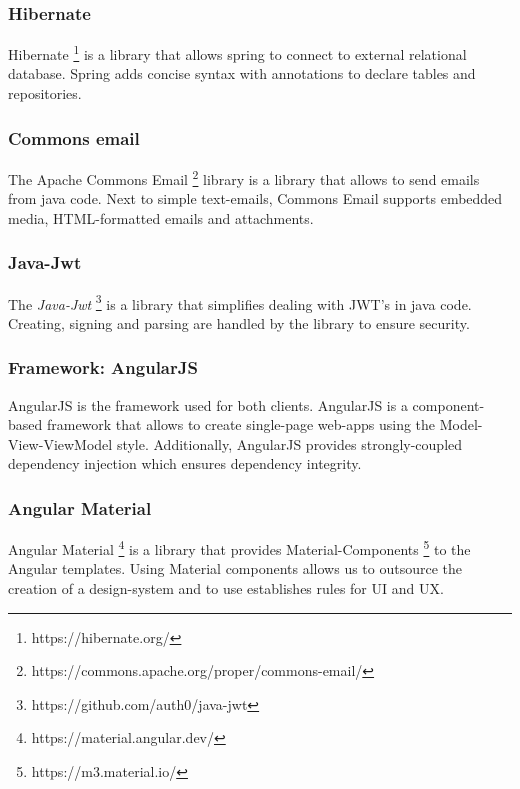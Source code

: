 \subsubsection{Hibernate}
Hibernate \footnote{https://hibernate.org/} is a library that allows spring to connect to external relational database.
Spring adds concise syntax with annotations to declare tables and repositories.

\subsubsection{Commons email}\label{subsubsec:commons-email}
The Apache Commons Email \footnote{https://commons.apache.org/proper/commons-email/} library is a library that allows to send emails from java code.
Next to simple text-emails, Commons Email supports embedded media, HTML-formatted emails and attachments.

\subsubsection{Java-Jwt}
The \textit{Java-Jwt} \footnote{https://github.com/auth0/java-jwt} is a library that simplifies dealing with JWT's in java code.
Creating, signing and parsing are handled by the library to ensure security.

\subsubsection{Framework: AngularJS}
AngularJS is the framework used for both clients. \newline
AngularJS is a component-based framework that allows to create single-page web-apps using the Model-View-ViewModel style.
Additionally, AngularJS provides strongly-coupled dependency injection which ensures dependency integrity.

\subsubsection{Angular Material}
Angular Material \footnote{https://material.angular.dev/} is a library that provides Material-Components \footnote{https://m3.material.io/} to the Angular templates.
Using Material components allows us to outsource the creation of a design-system and to use establishes rules for UI and UX.